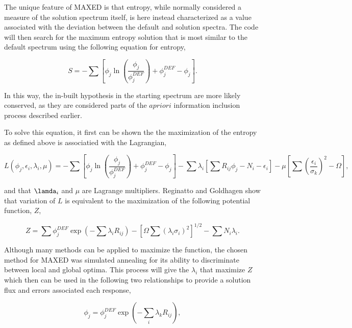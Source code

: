 The unique feature of MAXED is that entropy, while normally considered a measure of the solution spectrum itself, is here instead characterized as a value associated with the deviation between the default and solution spectra.
The code will then search for the maximum entropy solution that is most similar to the default spectrum using the following equation for entropy,

\begin{equation}\label{eqn:maxed-skilling}
S = - \sum [\phi_j \ln (\frac{\phi_j}{\phi_j^{DEF}}) + \phi_j^{DEF} - \phi_j] .
\end{equation}

In this way, the in-built hypothesis in the starting spectrum are more likely conserved, as they are considered parts of the $a priori$ information inclusion process described earlier.

To solve this equation, it first can be shown the the maximization of the entropy as defined above is associatied with the Lagrangian,

\begin{equation}\label{eqn:maxed-lagrangian}
L(\phi_j, \epsilon_i, \lambda_i, \mu) = -\sum [\phi_j \ln (\frac{\phi_j}{\phi_j^{DEF}}) + \phi_j^{DEF} - \phi_j] - \sum \lambda_i [\sum R_{ij} \phi_j - N_i - \epsilon_i] - \mu [\sum (\frac{\epsilon_i}{\sigma_k})^2 - \Omega] ,
\end{equation}

and that $\lamda_i$ and $\mu$ are Lagrange multipliers.
Reginatto and Goldhagen show that variation of $L$ is equivalent to the maximization of the following potential function, $Z$,

\begin{equation}\label{eqn:maxed-potential}
Z = \sum \phi_j^{DEF} \exp(-\sum \lambda_i R_{ij}) - [\Omega \sum (\lambda_i \sigma_i)^2]^{1/2} - \sum N_i \lambda_i .
\end{equation}

Although many methods can be applied to maximize the function, the chosen method for MAXED was simulated annealing for its ability to discriminate between local and global optima.
This process will give the $\lambda_i$ that maximize $Z$ which then can be used in the following two relationships to provide a solution flux and errors associated each response,

\begin{equation}\label{eqn:maxed-flux}
\phi_j = \phi_j^{DEF} \exp(- \sum_i \lambda_k R_{ij}) ,
\end{equation}

